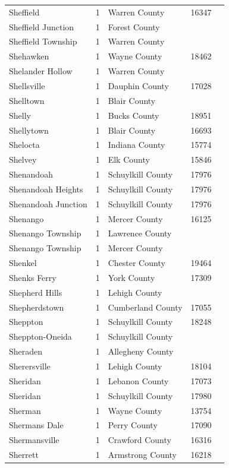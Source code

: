 \documentclass{article}
\begin{document}
\begin{tabular}{lllll}
Sheffield & 1 & Warren County & 16347 &  \\
Sheffield Junction & 1 & Forest County &  &  \\
Sheffield Township & 1 & Warren County &  &  \\
Shehawken & 1 & Wayne County & 18462 &  \\
Shelander Hollow & 1 & Warren County &  &  \\
Shellsville & 1 & Dauphin County & 17028 &  \\
Shelltown & 1 & Blair County &  &  \\
Shelly & 1 & Bucks County & 18951 &  \\
Shellytown & 1 & Blair County & 16693 &  \\
Shelocta & 1 & Indiana County & 15774 &  \\
Shelvey & 1 & Elk County & 15846 &  \\
Shenandoah & 1 & Schuylkill County & 17976 &  \\
Shenandoah Heights & 1 & Schuylkill County & 17976 &  \\
Shenandoah Junction & 1 & Schuylkill County & 17976 &  \\
Shenango & 1 & Mercer County & 16125 &  \\
Shenango Township & 1 & Lawrence County &  &  \\
Shenango Township & 1 & Mercer County &  &  \\
Shenkel & 1 & Chester County & 19464 &  \\
Shenks Ferry & 1 & York County & 17309 &  \\
Shepherd Hills & 1 & Lehigh County &  &  \\
Shepherdstown & 1 & Cumberland County & 17055 &  \\
Sheppton & 1 & Schuylkill County & 18248 &  \\
Sheppton-Oneida & 1 & Schuylkill County &  &  \\
Sheraden & 1 & Allegheny County &  &  \\
Sherersville & 1 & Lehigh County & 18104 &  \\
Sheridan & 1 & Lebanon County & 17073 &  \\
Sheridan & 1 & Schuylkill County & 17980 &  \\
Sherman & 1 & Wayne County & 13754 &  \\
Shermans Dale & 1 & Perry County & 17090 &  \\
Shermansville & 1 & Crawford County & 16316 &  \\
Sherrett & 1 & Armstrong County & 16218 &  \\

\end{tabular}
\end{document}
